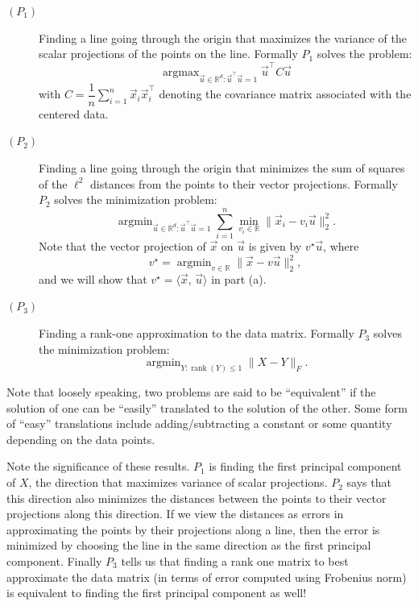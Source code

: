 \documentclass[10pt]{article}
\theoremstyle{definition}
\theoremstyle{plain}
\newcommand{\RR}{\mathbb{R}}
\DeclareMathOperator{\rank}{rank}
\DeclareMathOperator{\argmin}{argmin}
\DeclareMathOperator{\argmax}{argmax}
\begin{document}
\begin{description}
\item[$(P_1)$] Finding a line going through the origin that maximizes the variance of the scalar projections of the points on the line. Formally $P_1$ solves the problem:
\begin{equation}
\argmax_{\vec{u} \in \RR^d : \vec{u}^\top \vec{u} = 1} \vec{u}^\top C \vec{u}
\end{equation}
with $C = \dfrac{1}{n} \displaystyle\sum_{i=1}^{n} \vec{x}_i \vec{x}_i^\top$ denoting the covariance matrix associated with the centered data.

\item[$(P_2)$] Finding a line going through the origin that minimizes the sum of squares of the $\ell^2$ distances from the points to their vector projections. Formally $P_2$ solves the minimization problem:
\begin{equation}
\argmin_{\vec{u} \in \RR^d : \vec{u}^\top \vec{u} = 1} \sum_{i=1}^{n} \min_{v_i \in \RR} \|\vec{x}_i - v_i \vec{u}\|_2^2.
\end{equation}
Note that the vector projection of $\vec{x}$ on $\vec{u}$ is given by $v^\star \vec{u}$, where
\begin{equation}
v^\star = \argmin_{v \in \RR} \|\vec{x} - v\vec{u}\|_2^2,
\end{equation}
and we will show that $v^\star = \langle \vec{x},\, \vec{u} \rangle$ in part (a).

\item[$(P_3)$] Finding a rank-one approximation to the data matrix. Formally $P_3$ solves the minimization problem:
\begin{equation}
\argmin_{Y : \rank(Y) \le 1} \|X - Y\|_F.
\end{equation}
\end{description}

Note that loosely speaking, two problems are said to be ``equivalent'' if the solution of one can be ``easily'' translated to the solution of the other. Some form of ``easy'' translations include adding/subtracting a constant or some quantity depending on the data points.

Note the significance of these results. $P_1$ is finding the first principal component of $X$, the direction that maximizes variance of scalar projections. $P_2$ says that this direction also minimizes the distances between the points to their vector projections along this direction. If we view the distances as errors in approximating the points by their projections along a line, then the error is minimized by choosing the line in the same direction as the first principal component. Finally $P_3$ tells us that finding a rank one matrix to best approximate the data matrix (in terms of error computed using Frobenius norm) is equivalent to finding the first principal component as well!
\end{document}
